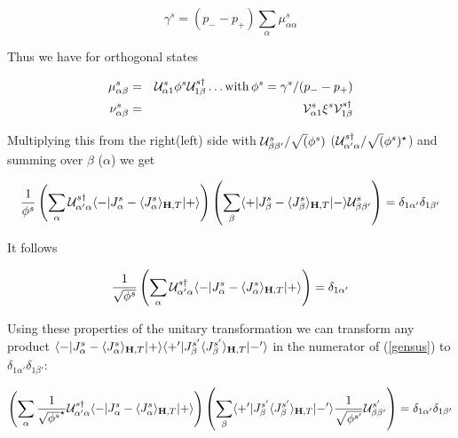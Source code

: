 \begin{equation}
 \gamma^s=(p_--p_+)\sum_{\alpha} \mu^s_{\alpha\alpha}
\end{equation}


Thus we have for orthogonal states 

\begin{eqnarray}
\mu^s_{\alpha\beta}&=&\B  \mathcal U_{\alpha 1}^s\phi^s\B  \mathcal U_{1\beta}^{s\dag} \dots %
{\rm with }\, \phi^s=\B  \gamma^s/(p_--p_+)\\
\nu^s_{\alpha\beta}&=&\B  \mathcal V_{\alpha 1}^s\xi^s\B  \mathcal V_{1\beta}^{s\dag}  
\end{eqnarray}

Multiplying this from the right(left) side with 
$\mathcal U_{\beta\beta'}^{s}/\sqrt(\phi^s)$
($\mathcal U_{\alpha'\alpha}^{s\dag}/\sqrt(\phi^s)^{\star}$)
and summing over $\beta$ ($\alpha$) we get

\begin{equation}
\frac{1}{\phi^s}\left ( \sum_{\alpha}\mathcal U_{\alpha'\alpha}^{s\dag} \langle -| J^{s }_{\alpha}-\langle J^{s }_{\alpha}\rangle_{\mathbf H,T} |+\rangle \right )
\left ( \sum_{\beta} \langle +|J^s_{\beta}-\langle J^s_{\beta}\rangle_{\mathbf H,T} |-\rangle\mathcal U_{\beta\beta'}^{s} \right )
= \delta_{1\alpha'} \delta_{1\beta'}
\end{equation}

It follows

\begin{equation}
\frac{1}{\sqrt{\phi^s}}
\left ( \sum_{\alpha}\mathcal U_{\alpha'\alpha}^{s\dag} \langle -| J^{s}_{\alpha}-\langle J^{s}_{\alpha}\rangle_{\mathbf H,T} |+\rangle \right )
= \delta_{1\alpha'}
\end{equation}

Using these properties of the unitary transformation we can transform any product
$\langle -|J_{\alpha}^s-\langle J_{\alpha}^s\rangle_{\mathbf H,T}|+\rangle \langle +'|J_{\beta}^{s'}\langle J_{\beta}^{s'}\rangle_{\mathbf H,T} |-'\rangle$ 
in the numerator of (\ref{gensus}) to $\delta_{1\alpha'} \delta_{1\beta'}$:

\begin{equation}\label{trafo1}
\left ( \sum_{\alpha}\frac{1}{\sqrt{\phi^s}^{\star}}\mathcal U_{\alpha'\alpha}^{s\dag} \langle -|J^{s}_{\alpha}-\langle J^{s}_{\alpha}\rangle_{\mathbf H,T}|+\rangle \right )
\left ( \sum_{\beta} \langle +'|J^{s'}_{\beta}\langle J^{s'}_{\beta}\rangle_{\mathbf H,T} |-'\rangle \frac{1}{\sqrt{\phi^{s'}}}\mathcal U_{\beta\beta'}^{s'} \right )
= \delta_{1\alpha'} \delta_{1\beta'}
\end{equation}


